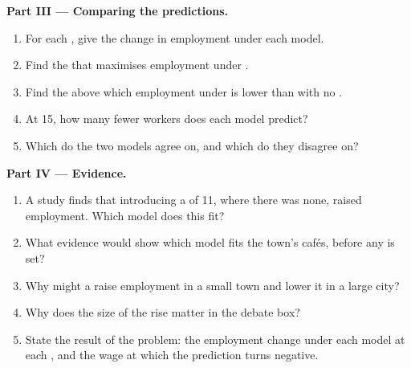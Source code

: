 \begin{problem}
\medskip
\noindent\textbf{Part III --- Comparing the predictions.}
\begin{enumerate}[resume]
\item For each , give the change in employment under each model.
\item Find the  that maximises employment under .
\item Find the  above which employment under  is lower than with no .
\item At 15, how many fewer workers does each model predict?
\item Which  do the two models agree on, and which do they disagree on?
\end{enumerate}

\medskip
\noindent\textbf{Part IV --- Evidence.}
\begin{enumerate}[resume]
\item A study finds that introducing a  of 11, where there was none, raised employment. Which model does this fit?
\item What evidence would show which model fits the town's cafés, before any  is set?
\item Why might a  raise employment in a small town and lower it in a large city?
\item Why does the size of the rise matter in the debate box?
\item State the result of the problem: the employment change under each model at each , and the wage at which the  prediction turns negative.
\end{enumerate}
\end{problem}
